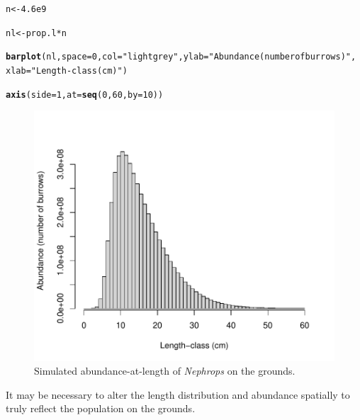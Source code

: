 \documentclass[12pt]{article}\usepackage[]{graphicx}\usepackage[]{color}
\makeatletter
\def\maxwidth{ %
  \ifdim\Gin@nat@width>\linewidth
    \linewidth
  \else
    \Gin@nat@width
  \fi
}
\newcommand{\hlnum}[1]{\textcolor[rgb]{0.686,0.059,0.569}{#1}}%
\newcommand{\hlstr}[1]{\textcolor[rgb]{0.192,0.494,0.8}{#1}}%
\newcommand{\hlopt}[1]{\textcolor[rgb]{0,0,0}{#1}}%
\newcommand{\hlstd}[1]{\textcolor[rgb]{0.345,0.345,0.345}{#1}}%
\newcommand{\hlkwb}[1]{\textcolor[rgb]{0.69,0.353,0.396}{#1}}%
\newcommand{\hlkwc}[1]{\textcolor[rgb]{0.333,0.667,0.333}{#1}}%
\newcommand{\hlkwd}[1]{\textcolor[rgb]{0.737,0.353,0.396}{\textbf{#1}}}%
\newenvironment{kframe}{%
 \def\at@end@of@kframe{}%
 \ifinner\ifhmode%
  \def\at@end@of@kframe{\end{minipage}}%
  \begin{minipage}{\columnwidth}%
 \fi\fi%
 \def\FrameCommand##1{\hskip\@totalleftmargin \hskip-\fboxsep
 \colorbox{shadecolor}{##1}\hskip-\fboxsep
     \hskip-\linewidth \hskip-\@totalleftmargin \hskip\columnwidth}%
 \MakeFramed {\advance\hsize-\width
   \@totalleftmargin\z@ \linewidth\hsize
   \@setminipage}}%
 {\par\unskip\endMakeFramed%
 \at@end@of@kframe}
\newenvironment{knitrout}{}{} %
\makeatother
\begin{document}
\begin{knitrout}\footnotesize
{}\color{fgcolor}\begin{kframe}
\begin{alltt}
\hlstd{n} \hlkwb{<-} \hlnum{4.6e9}

\hlstd{nl} \hlkwb{<-} \hlstd{prop.l} \hlopt{*} \hlstd{n}

\hlkwd{barplot}\hlstd{(nl,} \hlkwc{space} \hlstd{=} \hlnum{0}\hlstd{,} \hlkwc{col} \hlstd{=} \hlstr{"lightgrey"}\hlstd{,} \hlkwc{ylab} \hlstd{=} \hlstr{"Abundance (number of burrows)"}\hlstd{,}
        \hlkwc{xlab} \hlstd{=} \hlstr{"Length-class (cm)"}\hlstd{)}

\hlkwd{axis}\hlstd{(}\hlkwc{side} \hlstd{=} \hlnum{1}\hlstd{,} \hlkwc{at} \hlstd{=} \hlkwd{seq}\hlstd{(}\hlnum{0}\hlstd{,} \hlnum{60}\hlstd{,} \hlkwc{by} \hlstd{=} \hlnum{10}\hlstd{))}
\end{alltt}
\end{kframe}\begin{figure}

{\centering \includegraphics[width=\maxwidth]{figure/abundl-1} 

}

\caption[Simulated abundance-at-length of \emph{Nephrops} on the grounds]{Simulated abundance-at-length of \emph{Nephrops} on the grounds.}\label{fig:abundl}
\end{figure}


\end{knitrout}
It may be necessary to alter the length distribution and abundance spatially to truly reflect the population on the grounds.
\end{document}
